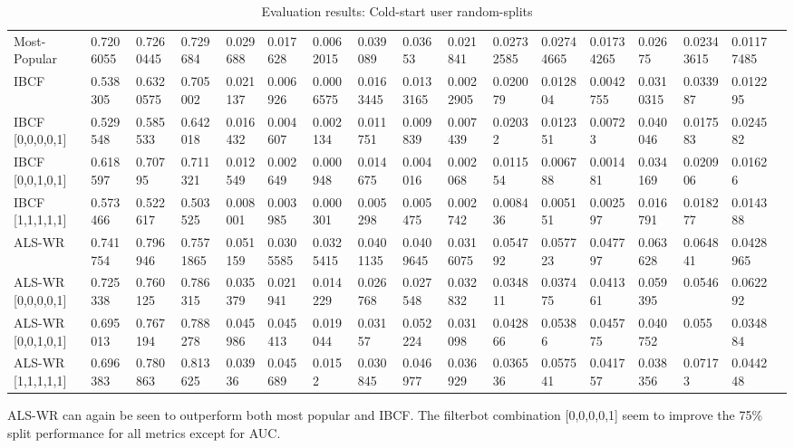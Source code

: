 \begin{table}[H]
{\begin{tabular}{*{17}{l}}
\rowcolor{Gray}
Most-Popular		& 0.7206055	& 0.7260445 &	0.729684&	0.029688&	0.017628	& 0.0062015 &	0.039089 &	0.03653 &	0.021841 &	0.02732585 &	0.02744665 &	0.01734265 &	0.02675 & 0.02343615 &	0.01177485& \\
\rowcolor{Gray}
IBCF				& 0.538305	& 0.6320575 &	0.705002 &	0.021137 &	0.006926 &	0.0006575 &	0.0163445 &	0.0133165 &	0.0022905 &	0.020079 &	0.012804&	0.0042755 &	0.0310315&	0.033987&	0.012295& \\
IBCF [0,0,0,0,1]    & 0.529548	& 0.585533&	0.642018&	0.016432&	0.004607&	0.002134&	0.011751&	0.009839&	0.007439&	0.02032	&	0.012351&	0.00723	&	0.040046	&	0.017583	&	0.024582	& \\
IBCF [0,0,1,0,1] 	& 0.618597  & 0.70795	& 0.711321&	0.012549&	0.002649&	0.000948&	0.014675&	0.004016&	0.002068&	0.011554&	0.006788&	0.001481	&	0.034169	&	0.020906	&	0.01626	 & \\
IBCF [1,1,1,1,1] 	& 0.573466	& 0.522617&	0.503525&	0.008001&	0.003985&	0.000301&	0.005298&	0.005475&	0.002742&	0.008436&	0.005151&	0.002597&	0.016791&	0.018277&	0.014388& \\
\rowcolor{Gray}
ALS-WR 				& 0.741754&	0.796946&	0.7571865&	0.051159&	0.0305585 &	0.0325415&	0.0401135&	0.0409645&	0.0316075&	0.054792&	0.057723&	0.047797&	0.063628&	0.064841	&	0.0428965	& \\
ALS-WR [0,0,0,0,1]  & 0.725338&	0.760125&	0.786315&	0.035379&	0.021941&	0.014229&	0.026768&	0.027548&	0.032832&	0.034811&	0.037475&	0.041361&	0.059395&	0.0546	&	0.062292	& \\
ALS-WR [0,0,1,0,1] 	& 0.695013&	0.767194&	0.788278&	0.045986 &	0.045413&	0.019044&	0.03157&	0.052224&	0.031098&	0.042866&	0.05386	& 0.045775&	0.040752& 0.055& 0.034884& \\
ALS-WR [1,1,1,1,1] 	& 0.696383&	0.780863&	0.813625&	0.03936	&	0.045689&	0.0152	&	0.030845&	0.046977&	0.036929&	0.036536	&	0.057541	&	0.041757&	0.038356	&	0.07173	&	0.044248	& \\

\bottomrule
\end{tabular}
}
\caption{Evaluation results: Cold-start user random-splits}
\end{table}

ALS-WR can again be seen to outperform both most popular and IBCF. The filterbot combination [0,0,0,0,1] seem to improve the 75\% split performance for all
metrics except for AUC.


